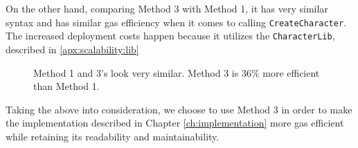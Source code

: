 On the other hand, comparing Method 3 with Method 1, it has very similar syntax and has similar gas efficiency when it comes to calling \texttt{CreateCharacter}. The increased deployment costs happen because it utilizes the \texttt{CharacterLib}, described in \ref{apx:scalability:lib}

\begin{figure}[ht!]

    \vspace{1cm}

    \caption{Method 1 and 3's look very similar. Method 3 is 36\% more efficient than Method 1.}
    \label{fig:method13:comparison}

\end{figure}

Taking the above into consideration, we choose to use Method 3 in order to make the implementation described in Chapter \ref{ch:implementation} more gas efficient while retaining its readability and maintainability.

